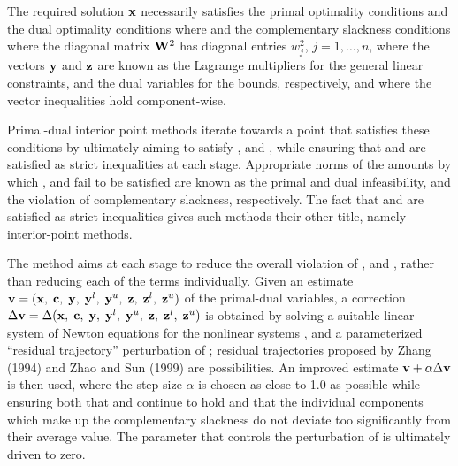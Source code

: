 \documentclass{galahad}
\begin{document}

\galmethod
The required solution ${\mathbf{x}}$ necessarily satisfies
the primal optimality conditions
and
the dual optimality conditions
where
and the complementary slackness conditions
where the diagonal matrix ${\mathbf{W}}^{2}$ has diagonal entries $w_{j}^{2}$,
$j = 1, \ldots , n$, where the vectors ${\mathbf{y}}$ and ${\mathbf{z}}$ are
known as the Lagrange multipliers for
the general linear constraints, and the dual variables for the bounds,
respectively, and where the vector inequalities hold component-wise.

Primal-dual interior point methods iterate towards a point
that satisfies these conditions by ultimately aiming to satisfy
,  and , while ensuring that
 and  are
satisfied as strict inequalities at each stage.
Appropriate norms of the amounts by
which ,  and  fail to be satisfied are known as the
primal and dual infeasibility, and the violation of complementary slackness,
respectively. The fact that  and  are satisfied as strict
inequalities gives such methods their other title, namely
interior-point methods.

The method aims at each stage to reduce the
overall violation of ,  and ,
rather than reducing each of the terms individually. Given an estimate
${\mathbf{v}} = ({\mathbf{x}}, \; {\mathbf{c}}, \; {\mathbf{y}}, \; {\mathbf{y}}^{l}, \;
{\mathbf{y}}^{u}, \; {\mathbf{z}}, \; {\mathbf{z}}^{l}, \; {\mathbf{z}}^{u})$
of the primal-dual variables, a correction
$\Delta {\mathbf{v}} = \Delta ({\mathbf{x}}, \; {\mathbf{c}}, \; {\mathbf{y}}, \; {\mathbf{y}}^{l},
 \; {\mathbf{y}}^{u} ,\;{\mathbf{z}},\;{\mathbf{z}}^{l} ,\;{\mathbf{z}}^{u} )$
is obtained by solving a suitable linear system of Newton equations for the
nonlinear systems ,  and a parameterized ``residual
trajectory'' perturbation of ; residual trajectories
proposed by Zhang (1994) and Zhao and Sun (1999) are possibilities.
An improved estimate ${\mathbf{v}} + \alpha \Delta {\mathbf{v}}$
is then used, where the step-size $\alpha$
is chosen as close to 1.0 as possible while ensuring both that
 and  continue to hold and that the individual components
which make up the complementary slackness
 do not deviate too significantly
from their average value. The parameter that controls the perturbation
of  is ultimately driven to zero.
\end{document}
